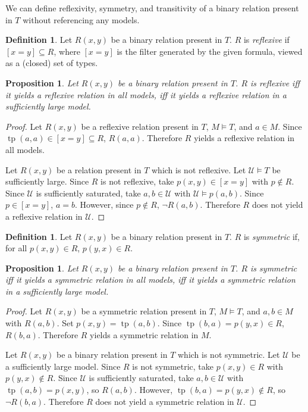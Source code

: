 \documentclass[letterpaper,twoside]{article}
\newtheorem{proposition}[theorem]{Proposition}
\theoremstyle{definition}
\newtheorem{definition}[theorem]{Definition}
\theoremstyle{remark}
\newcommand{\defterm}[1]{\emph{#1}}
\DeclareMathOperator{\tp}{tp}
\begin{document}
We can define reflexivity, symmetry, and transitivity of a binary
relation present in \(T\) without referencing any models.

\begin{definition}
  Let \(R(x,y)\) be a binary relation present in \(T\).  \(R\) is
  \defterm{reflexive} if \([x = y] \subseteq R\), where \([x = y]\) is
  the filter generated by the given formula, viewed as a (closed) set
  of types.
\end{definition}

\begin{proposition}
  Let \(R(x,y)\) be a binary relation present in \(T\).  \(R\) is
  reflexive iff it yields a reflexive relation in all models, iff it
  yields a reflexive relation in a sufficiently large model.
\end{proposition}
\begin{proof}
  Let \(R(x,y)\) be a reflexive relation present in \(T\), \(M \models
  T\), and \(a \in M\).  Since \(\tp(a,a) \in [x = y] \subseteq R\),
  \(R(a,a)\).  Therefore \(R\) yields a reflexive relation in all models.

  Let \(R(x,y)\) be a relation present in \(T\) which is not
  reflexive.  Let \(\mathcal{U} \models T\) be sufficiently large.
  Since \(R\) is not reflexive, take \(p(x,y) \in [x = y]\) with \(p
  \notin R\).  Since \(\mathcal{U}\) is sufficiently saturated, take
  \(a,b \in \mathcal{U}\) with \(\mathcal{U} \models p(a,b)\).  Since
  \(p \in [x = y]\), \(a = b\).  However, since \(p \notin R\), \(\neg
  R(a,b)\).  Therefore \(R\) does not yield a reflexive relation in
  \(\mathcal{U}\).
\end{proof}

\begin{definition}
  Let \(R(x,y)\) be a binary relation present in \(T\).  \(R\) is
  \defterm{symmetric} if, for all \(p(x,y) \in R\), \(p(y,x) \in R\).
\end{definition}

\begin{proposition}
  Let \(R(x,y)\) be a binary relation present in \(T\).  \(R\) is
  symmetric iff it yields a symmetric relation in all models, iff it
  yields a symmetric relation in a sufficiently large model.
\end{proposition}
\begin{proof}
  Let \(R(x,y)\) be a symmetric relation present in \(T\), \(M \models
  T\), and \(a,b \in M\) with \(R(a,b)\).  Set \(p(x,y) = \tp(a,b)\).
  Since \(\tp(b,a) = p(y,x) \in R\), \(R(b,a)\).  Therefore \(R\)
  yields a symmetric relation in \(M\).

  Let \(R(x,y)\) be a binary relation present in \(T\) which is not
  symmetric.  Let \(\mathcal{U}\) be a sufficiently large model.
  Since \(R\) is not symmetric, take \(p(x,y) \in R\) with \(p(y,x)
  \notin R\).  Since \(\mathcal{U}\) is sufficiently saturated, take
  \(a,b \in \mathcal{U}\) with \(\tp(a,b) = p(x,y)\), so \(R(a,b)\).
  However, \(\tp(b,a) = p(y,x) \notin R\), so \(\neg R(b,a)\).
  Therefore \(R\) does not yield a symmetric relation in
  \(\mathcal{U}\).
\end{proof}
\end{document}
